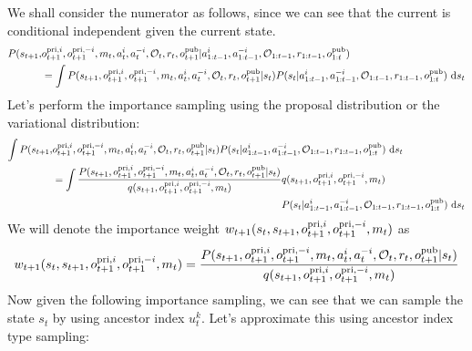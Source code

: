 We shall consider the numerator as follows, since we can see that the current is conditional independent given the current state.
\begin{equation}
\begin{aligned}
    P(s_{t+1}, &o^{\operatorname{pri}, i}_{t+1}, o^{\operatorname{pri}, -i}_{t+1}, m_t, a^i_t, a^{-i}_t, \mathcal{O}_t, r_t , o^{\operatorname{pub}}_{t+1}| a^{i}_{1:t-1}, a^{-i}_{1:t-1}, \mathcal{O}_{1:t-1}, r_{1:t-1}, o^{\operatorname{pub}}_{1:t}) \\
    &= \int P(s_{t+1}, o^{\operatorname{pri}, i}_{t+1}, o^{\operatorname{pri}, -i}_{t+1}, m_t, a^i_t, a^{-i}_t, \mathcal{O}_t, r_t , o^{\operatorname{pub}}_{t+1} | s_t) 
    P(s_t | a^{i}_{1:t-1}, a^{-i}_{1:t-1}, \mathcal{O}_{1:t-1}, r_{1:t-1}, o^{\operatorname{pub}}_{1:t}) \ \mathrm{d} s_t
\end{aligned}
\end{equation}
Let's perform the importance sampling using the proposal distribution or the variational distribution:
\begin{equation}
\begin{aligned}
    \int P(s_{t+1}, &o^{\operatorname{pri}, i}_{t+1}, o^{\operatorname{pri}, -i}_{t+1}, m_t, a^i_t, a^{-i}_t, \mathcal{O}_t, r_t , o^{\operatorname{pub}}_{t+1} | s_t) 
    P(s_t | a^{i}_{1:t-1}, a^{-i}_{1:t-1}, \mathcal{O}_{1:t-1}, r_{1:t-1}, o^{\operatorname{pub}}_{1:t})\ \mathrm{d} s_t \\
    &= \begin{aligned}[t]
        \int \frac{P(s_{t+1}, o^{\operatorname{pri}, i}_{t+1}, o^{\operatorname{pri}, -i}_{t+1}, m_t, a^i_t, a^{-i}_t, \mathcal{O}_t, r_t , o^{\operatorname{pub}}_{t+1} | s_t)}{q(s_{t+1}, o^{\operatorname{pri}, i}_{t+1}, o^{\operatorname{pri}, -i}_{t+1}, m_t)} &q(s_{t+1}, o^{\operatorname{pri}, i}_{t+1}, o^{\operatorname{pri}, -i}_{t+1}, m_t) \\
        &P(s_t | a^{i}_{1:t-1}, a^{-i}_{1:t-1}, \mathcal{O}_{1:t-1}, r_{1:t-1}, o^{\operatorname{pub}}_{1:t}) \ \mathrm{d} s_t
    \end{aligned}
\end{aligned}
\end{equation}
We will denote the importance weight $w_{t+1}(s_t, s_{t+1}, o^{\operatorname{pri}, i}_{t+1}, o^{\operatorname{pri}, -i}_{t+1}, m_t)$ as 
\begin{equation}
    w_{t+1}(s_t, s_{t+1}, o^{\operatorname{pri}, i}_{t+1}, o^{\operatorname{pri}, -i}_{t+1}, m_t) = \frac{P(s_{t+1}, o^{\operatorname{pri}, i}_{t+1}, o^{\operatorname{pri}, -i}_{t+1}, m_t, a^i_t, a^{-i}_t, \mathcal{O}_t, r_t , o^{\operatorname{pub}}_{t+1} | s_t)}{q(s_{t+1}, o^{\operatorname{pri}, i}_{t+1}, o^{\operatorname{pri}, -i}_{t+1}, m_t)}
\end{equation}
Now given the following importance sampling, we can see that we can sample the state $s_t$ by using ancestor index $u^k_t$. Let's approximate this using ancestor index type sampling:
